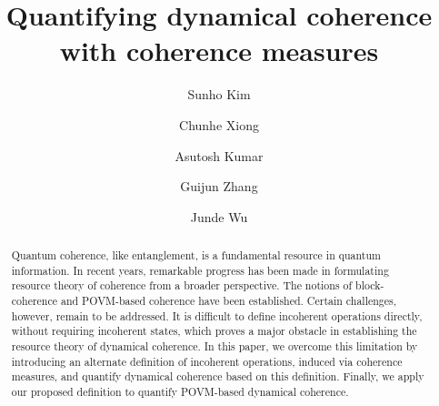 \documentclass[american,aps,pra,reprint, superscriptaddress]{revtex4-1}
\theoremstyle{plain}
\theoremstyle{definition}
\theoremstyle{remark}
\begin{document}
 \author{Sunho Kim}


  \author{Chunhe Xiong}

\author{Asutosh Kumar}

\author{Guijun Zhang}

 \author{Junde Wu}


\title{Quantifying dynamical coherence with coherence measures}
\begin{abstract}
Quantum coherence, like entanglement, is a fundamental resource in quantum information.
In recent years, remarkable progress has been made in formulating resource theory of coherence from a broader perspective. The notions of block-coherence and POVM-based coherence have been established.
%
Certain challenges, however, remain to be addressed. It is difficult to define incoherent operations directly, without requiring incoherent states, which proves a major obstacle in establishing the resource theory of  dynamical coherence.
In this paper, we overcome this limitation by introducing an alternate definition of incoherent operations, induced via coherence measures, and quantify dynamical coherence based on this definition. Finally, we apply our proposed definition to quantify POVM-based dynamical coherence. %
\end{abstract}
\maketitle
\end{document}
